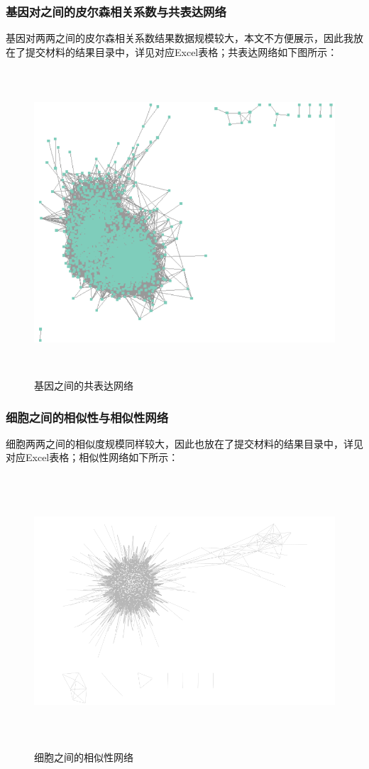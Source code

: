 \documentclass {article}
\begin{document}
		\subsubsection{基因对之间的皮尔森相关系数与共表达网络}
			基因对两两之间的皮尔森相关系数结果数据规模较大，本文不方便展示，因此我放在了提交材料的结果目录中，详见对应Excel表格；共表达网络如下图所示：
				\begin{figure}[H]
					\centering
					\includegraphics[width=4.5in,height=4.5in]{figures/fig5.jpg}
					\caption{基因之间的共表达网络}
				\end{figure}			
		
		\subsubsection{细胞之间的相似性与相似性网络}
			细胞两两之间的相似度规模同样较大，因此也放在了提交材料的结果目录中，详见对应Excel表格；相似性网络如下所示：
				\begin{figure}[H]
					\centering
					\includegraphics[width=4.5in,height=4in]{figures/fig6.png}
					\caption{细胞之间的相似性网络}
				\end{figure}			
		
\end{document}
